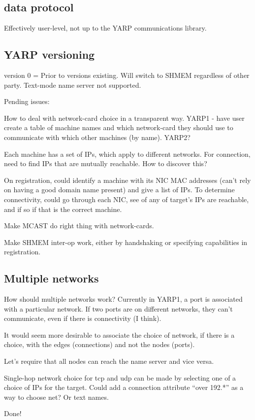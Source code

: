 \documentclass[a4]{article}
\begin{document}
\subsection{data protocol}

Effectively user-level, not up to the YARP communications library.


\subsection{YARP versioning}


version 0 = Prior to versions existing.
Will switch to SHMEM regardless of other party.
Text-mode name server not supported.

Pending issues: 

How to deal with network-card choice in a transparent
way.  YARP1 - have user create a table of machine names and which
network-card they should use to communicate with which other machines
(by name).  YARP2?  

Each machine has a set of IPs, which apply to different networks.
For connection, need to find IPs that are mutually reachable.
How to discover this?

On registration, could identify a machine with its NIC 
MAC addresses (can't rely on having a good domain name present)
and give a list of IPs.  To determine connectivity, could go
through each NIC, see of any of target's IPs are reachable,
and if so if that is the correct machine.


Make MCAST do right thing with network-cards.

Make SHMEM inter-op work, either by handshaking or specifying 
capabilities in registration.


\subsection{Multiple networks}

How should multiple networks work?  Currently in YARP1, a port is
associated with a particular network.  If two ports are on different
networks, they can't communicate, even if there is connectivity
(I think).

It would seem more desirable to associate the choice of network,
if there is a choice, with the edges (connections) and not the
nodes (ports).

Let's require that all nodes can reach the name server and vice
versa.

Single-hop network choice for tcp and udp can be made by selecting one
of a choice of IPs for the target.  Could add a connection attribute
``over 192.*'' as a way to choose net?  Or text names.

Done!
\end{document}

